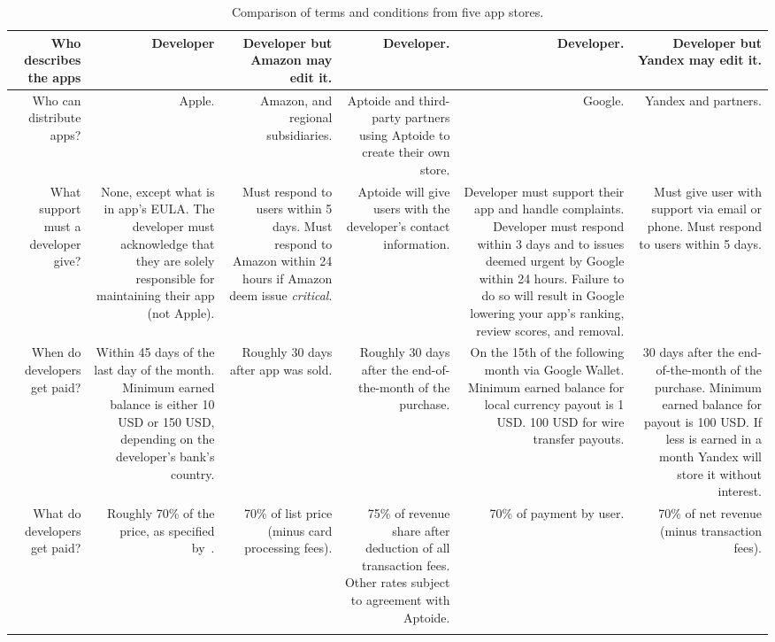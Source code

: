 \documentclass[thesis.tex]{subfiles}
\begin{document}
{{\begin{longtable}{RRRRRR}
    Who describes the apps
 & Developer
 & Developer but Amazon may edit it.
 & Developer.
 & Developer.
 & Developer but Yandex may edit it.
                                              \\\midrule
    Who can distribute apps?
 & Apple.
 & Amazon, and regional subsidiaries.
 & Aptoide and third-party partners using Aptoide to create their own store.
 & Google.
 & Yandex and partners.
                                              \\\midrule
    What support must a developer give?
 & None, except what is in app's EULA.  The developer must acknowledge that they are solely responsible for maintaining their app (not Apple).
 & Must respond to users within 5 days.  Must respond to Amazon within 24 hours if Amazon deem issue \emph{critical}.
 & Aptoide will give users with the developer's contact information.
 & Developer must support their app and handle complaints.  Developer must respond within 3 days and to issues deemed urgent by Google within 24 hours.  Failure to do so will result in Google lowering your app's ranking, review scores, and removal.
 & Must give user with support via email or phone.  Must respond to users within 5 days.
                                              \\\midrule
    When do developers get paid?
 & Within 45 days of the last day of the month.  Minimum earned balance is either 10 USD or 150 USD, depending on the developer's bank's country.
 & Roughly 30 days after app was sold.
 & Roughly 30 days after the end-of-the-month of the purchase.
 & On the 15th of the following month via Google Wallet.  Minimum earned balance for local currency payout is 1 USD. 100 USD for wire transfer payouts.
 & 30 days after the end-of-the-month of the purchase.  Minimum earned balance for payout is 100 USD.  If less is earned in a month Yandex will store it without interest.
                                              \\\midrule
    What do developers get paid?
 & Roughly 70\% of the price, as specified by~\cite{apple_itunes_2017}.
 & 70\% of list price (minus card processing fees).
 & 75\% of revenue share after deduction of all transaction fees.  Other rates subject to agreement with Aptoide.
 & 70\% of payment by user.
 & 70\% of net revenue (minus transaction fees).
                                              \\
    \bottomrule
    \caption{Comparison of terms and conditions from five app stores.}
    \label{tab:terms-and-conditions}
  \end{longtable}
}}
\end{document}
